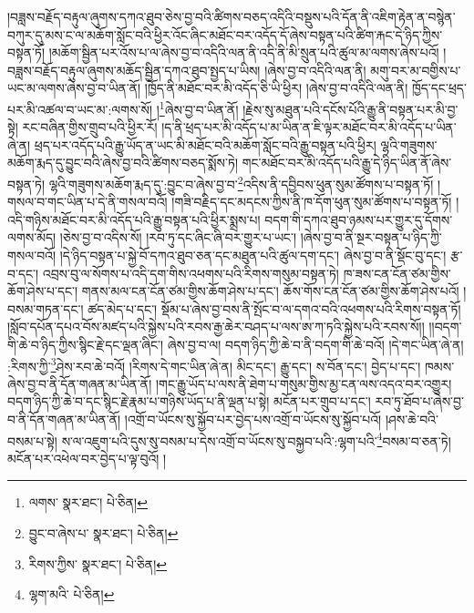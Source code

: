 །བཟླས་བརྗོད་བརྟུལ་ཞུགས་དཀའ་ཐུབ་ཅེས་བྱ་བའི་ཚིགས་བཅད་འདིའི་བསྡུས་པའི་དོན་ནི་འཇིག་རྟེན་ན་བསྙེན་བཀུར་དུ་མས་ང་ལ་མཆོག་སློང་བའི་ཕྱིར་འོང་ཞིང་མཐོང་བར་འདོད་དོ་ཞེས་བསྟན་པའི་ཚིག་རྐང་དེ་ཉིད་ཀྱིས་བསྟན་ཏོ། །མཆོག་སྦྱིན་པར་འོས་པ་ལ་ཞེས་བྱ་བ་འདིའི་ལན་ནི་འདི་ནི་མི་སྲུན་པའི་ཚུལ་མ་ལགས་ཞེས་པའོ། །བཟླས་བརྗོད་བརྟུལ་ཞུགས་མཆོད་སྦྱིན་དཀའ་ཐུབ་སྤྱད་པ་ཡིས། །ཞེས་བྱ་བ་འདིའི་ལན་ནི། མགུ་བར་མ་བགྱིས་པ་ཡང་མ་ལགས་ཞེས་བྱ་བ་ཡིན་ནོ། །ཁྱོད་ནི་མཐོང་བར་མི་འདོད་ཅི་ཡི་ཕྱིར། །ཞེས་བྱ་བ་འདིའི་ལན་ནི། ཁྱོད་དང་ཕྲད་པར་མི་འཚལ་བ་ཡང་མ་:ལགས་སོ། །\footnote{ལགས་  སྣར་ཐང་།  པེ་ཅིན། }ཞེས་བྱ་བ་ཡིན་ནོ། །རྗེས་སུ་མཐུན་པའི་དངོས་པོའི་རྒྱུ་ནི་བསྟན་པར་མི་བྱ་སྟེ། རང་བཞིན་གྱིས་གྲུབ་པའི་ཕྱིར་རོ། །ད་ནི་ཕྲད་པར་མི་འདོད་པ་མ་ཡིན་ན་ཇི་ལྟར་མཐོང་བར་མི་འདོད་པ་ཡིན་ཞེ་ན། ཕྲད་པར་འདོད་པའི་རྒྱུ་ཡོད་ན་ཡང་མི་མཐོང་བའི་མཆོག་སློང་བའི་རྒྱུ་བསྟན་པའི་ཕྱིར། ལྷའི་གཟུགས་མཆོག་རྨད་དུ་བྱུང་བའི་ཞེས་བྱ་བའི་ཚིགས་བཅད་སྨོས་ཏེ། གང་མཐོང་བར་མི་འདོད་པའི་རྒྱུ་དེ་ཉིད་ཡིན་ནོ་ཞེས་བསྟན་ཏེ། ལྷའི་གཟུགས་མཆོག་རྨད་དུ་:བྱུང་བ་ཞེས་བྱ་བ་\footnote{བྱུང་བ་ཞེས་པ་  སྣར་ཐང་།  པེ་ཅིན། }འདིས་ནི་དབྱིབས་ཕུན་སུམ་ཚོགས་པ་བསྟན་ཏོ། །གསལ་བ་གང་ཡིན་པ་དེ་ནི་གསལ་བའོ། །གཟི་བརྗིད་དང་མདངས་ཀྱིས་ནི་ཁ་དོག་ཕུན་སུམ་ཚོགས་པ་བསྟན་ཏོ། །འདི་གཉིས་མཐོང་བར་མི་འདོད་པའི་རྒྱུ་བསྟན་པའི་ཕྱིར་སྨྲས་པ། བདག་གི་དཀའ་ཐུབ་ཉམས་པར་གྱུར་དུ་དོགས་ལགས་མོད། །ཅེས་བྱ་བ་འདིས་སོ། །རབ་ཏུ་དང་ཞིང་ཞི་བར་གྱུར་པ་ཡང་། །ཞེས་བྱ་བ་ནི་སྔར་བསྟན་པ་ཉིད་ཀྱི་གསལ་བའོ། །དེ་ཉིད་བསྟན་པ་སྐྱེ་བོ་དཀའ་ཐུབ་ཅན་དང་མཐུན་པའི་ཚུལ་དག་དང་། ཞེས་བྱ་བ་ནི་སྡོང་བུ་དང་། རྩ་བ་དང་། འབྲས་བུ་ལ་སོགས་པ་འདི་དག་གིས་འཕགས་པའི་རིགས་གསུམ་བསྟན་ཏེ། ཁ་ཟས་ངན་ངོན་ཙམ་གྱིས་ཆོག་ཤེས་པ་དང་། གནས་མལ་ངན་ངོན་ཙམ་གྱིས་ཆོག་ཤེས་པ་དང་། ཆོས་གོས་ངན་ངོན་ཙམ་གྱིས་ཆོག་ཤེས་པའོ། །བསམ་གཏན་དང་། ཚད་མེད་པ་དང་། སྡོམ་པ་ཞེས་བྱ་བས་ནི་སྤོང་བ་ལ་དགའ་བའི་འཕགས་པའི་རིགས་བསྟན་ཏོ། །སློབ་དཔོན་དཔའ་བོས་མཛད་པའི་སྐྱེས་པའི་རབས་རྒྱ་ཆེར་བཤད་པ་ལས་ཨ་ཀ་ཏའི་སྐྱེས་པའི་རབས་སོ།། །།བདག་གི་ཆེ་བ་ཉིད་ཀྱིས་སྙིང་རྗེ་དང་ལྡན་ཞིང་། ཞེས་བྱ་བ་ལ། བདག་ཉིད་ཀྱི་ཆེ་བ་ནི་བདག་གི་ཆེ་བའོ། །དེ་གང་ཡིན་ཞེ་ན། :རིགས་ཀྱི་\footnote{རིགས་ཀྱིས་  སྣར་ཐང་།  པེ་ཅིན། }ཤེས་རབ་ཆེ་བའོ། །རིགས་དེ་གང་ཡིན་ཞེ་ན། མིང་དང་། རྒྱུ་དང་། ས་བོན་དང་། བྱེད་པ་དང་། ཁམས་ཞེས་བྱ་བ་ནི་དོན་གཞན་མ་ཡིན་ནོ། །གང་རྒྱུ་ཡོད་པ་ལས་ནི་ཐེག་པ་གསུམ་གྱིས་མྱ་ངན་ལས་འདའ་བར་འགྱུར། བདག་ཉིད་ཀྱི་ཆེ་བ་དང་སྙིང་རྗེ་རྣམ་པ་གཉིས་ཡོད་པ་ནི་ལྡན་པ་སྟེ། མངོན་པར་གྲུབ་པ་དང་། རབ་ཏུ་ཐོབ་པ་ཞེས་བྱ་བ་ནི་དོན་གཞན་མ་ཡིན་ནོ། །འགྲོ་བ་ཡོངས་སུ་སྐྱོབ་པར་བྱེད་པས་འགྲོ་བ་ཡོངས་སུ་སྐྱོབ་པའོ། །ཤས་ཆེ་བའི་བསམ་པ་སྟེ། ས་ལ་འཇུག་པའི་དུས་སུ་བསམ་པ་དེས་འགྲོ་བ་ཡོངས་སུ་བསྐྱབ་པའི་:ལྷག་པའི་\footnote{ལྷག་མའི་  པེ་ཅིན། }བསམ་བ་ཅན་ཏེ། མངོན་པར་འཕེལ་བར་བྱེད་པ་ལྟ་བུའོ། །
